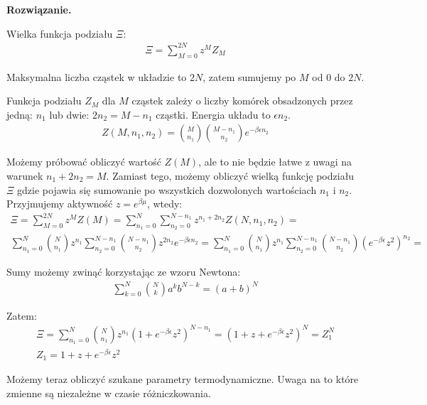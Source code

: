 \documentclass[11pt,a4paper]{article}
\newenvironment{solution}{\vspace{1cm} \par\textbf{Rozwiązanie.} \vspace{1cm}}{}
\begin{document}
\begin{solution}

Wielka funkcja podziału $\Xi$: 
\begin{align*}
  \Xi = \sum_{M=0}^{2N} z^M Z_M
\end{align*}

Maksymalna liczba cząstek w układzie to $2N$, zatem sumujemy po $M$ od $0$ do $2N$.

\vskip 0.2cm

Funkcja podziału $Z_M$ dla $M$ cząstek zależy o liczby komórek obsadzonych przez
jedną: $n_{1}$ lub dwie: $2n_{2} = M - n_{1}$ cząstki. 
Energia układu to $\epsilon n_2$.
\begin{align*}
Z(M, n_1, n_2) = \binom{M}{n_1} \binom{M-n_1}{n_2} e^{-\beta \epsilon n_2}
\end{align*}

Możemy próbować obliczyć wartość $Z(M)$, ale to nie będzie łatwe z uwagi na warunek
$n_1 + 2 n_2 = M$. Zamiast tego, możemy obliczyć wielką funkcję podziału $\Xi$ 
gdzie pojawia się sumowanie po wszystkich dozwolonych wartościach $n_1$ i $n_2$.
Przyjmujemy aktywność $z = e^{\beta \mu}$, wtedy:
\begin{align*}
  \Xi = \sum_{M=0}^{2N} z^M Z(M) =
  \sum_{n_1=0}^{N} \sum_{n_2=0}^{N-n_1} z^{n_1 + 2 n_2} Z(N, n_1, n_2) = \\
  \sum_{n_1=0}^{N} \binom{N}{n_1} z^{n_1} \sum_{n_2=0}^{N-n_1} \binom{N-n_1}{n_2} z^{2 n_2} e^{-\beta \epsilon n_2} = 
   \sum_{n_1=0}^{N} \binom{N}{n_1} z^{n_1} \sum_{n_2=0}^{N-n_1} \binom{N-n_1}{n_2} (e^{-\beta \epsilon}z^{2})^{n_2} = 
\end{align*}

\vskip 0.2cm

Sumy możemy zwinąć korzystając ze wzoru Newtona:
\begin{align*}
  \sum_{k=0}^{N} \binom{N}{k} a^{k}b^{N-k} = (a + b)^N 
\end{align*}

Zatem:
\begin{align*}
  \Xi = \sum_{n_1=0}^{N} \binom{N}{n_1} z^{n_1} (1 + e^{-\beta \epsilon}z^{2})^{N-n_1} = 
  (1 + z + e^{-\beta \epsilon}z^{2})^N = Z_{1}^N \\
   Z_{1} = 1 + z + e^{-\beta \epsilon}z^{2}
\end{align*}

\newpage

Możemy teraz obliczyć szukane parametry termodynamiczne.
Uwaga na to które zmienne są niezależne w czasie różniczkowania.


\end{solution}
\end{document}
